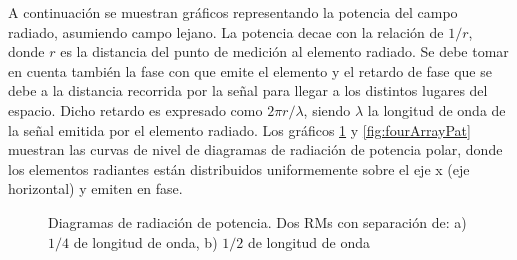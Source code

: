 A continuación se muestran gráficos representando la potencia del campo radiado, asumiendo campo lejano. La potencia decae
con la relación de $1/r$, donde $r$ es la distancia del punto de medición al elemento radiado. Se debe tomar en cuenta también
la fase con que emite el elemento y el retardo de fase que se debe a la distancia recorrida por la señal para llegar a los 
distintos lugares del espacio. Dicho retardo es expresado como $2\pi r/\lambda$, siendo $\lambda$ la longitud de onda de la 
señal emitida por el elemento radiado. Los gráficos \ref{fig:twoArrayPat} y \ref{fig:fourArrayPat} muestran las curvas de 
nivel de diagramas de radiación de potencia polar, donde los elementos radiantes están distribuidos uniformemente sobre el eje
x (eje horizontal) y emiten en fase.

\begin{figure}[H]
	\centering
	\caption{Diagramas de radiación de potencia. Dos RMs con separación de: a) $1/4$ de longitud de onda, b) $1/2$ de longitud de onda}
	\label{fig:twoArrayPat}
\end{figure}

